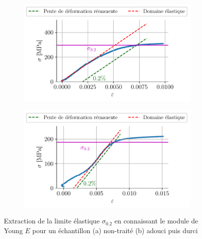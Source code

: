 \begin{figure}[H]
    \centering
    \begin{subfigure}{0.48\linewidth}
        \centering
        \includegraphics[width=\linewidth]{figures/froid2_sigma2.pdf}
        \caption{}
        \label{fig:froid1_lim}
    \end{subfigure}
    \begin{subfigure}{0.48\linewidth}
        \centering
        \includegraphics[width=\linewidth]{figures/tiede6_sigma2.pdf}
        \caption{}
        \label{fig:tiede6_lim}
    \end{subfigure}
    \caption{Extraction de la limite élastique $\sigma_{0.2}$ en connaissant le module de Young $E$ pour un échantillon (a) non-traité (b) adouci puis durci}
    \label{fig:limite_elastique}
\end{figure}



